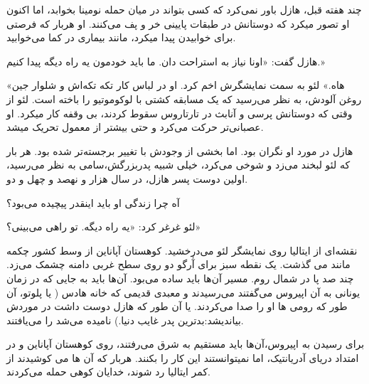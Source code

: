 \documentclass{book}
\begin{document}
چند هفته قبل، هازل باور نمی‌کرد که کسی بتواند در میان حمله نومینا بخوابد، اما اکنون او تصور میکرد که دوستانش در طبقات پایینی خر و پف می‌کنند. او هربار که فرصتی برای خوابیدن پیدا میکرد، مانند بیماری در کما می‌خوابید.

هازل گفت: «اونا نیاز به استراحت دان. ما باید خودمون یه راه دیگه پیدا کنیم.»

«هاه.»  لئو به سمت نمایشگرش اخم کرد. او در لباس کار تکه تکه‌اش و شلوار جین روغن آلودش، به نظر می‌رسید که یک مسابقه کشتی با لوکوموتیو را باخته است. لئو از وقتی که دوستانش پرسی و آنابث در تارتاروس سقوط کردند، بی وقفه کار میکرد. او عصبانی‌تر حرکت می‌کرد و حتی بیشتر از معمول تحریک میشد.

هازل در مورد او نگران بود. اما بخشی از وجودش با تغییر برجسته‌تر شده بود. هر بار که لئو لبخند می‌زد و شوخی می‌کرد، خیلی شبیه پدربزرگش،‌سامی به نظر می‌رسید، اولین دوست پسر هازل، در سال هزار و نهصد و چهل و دو.

آه چرا زندگی او باید اینقدر پیچیده می‌بود؟

لئو غرغر کرد: «یه راه دیگه. تو راهی می‌بینی؟»

نقشه‌ای از ایتالیا روی نمایشگر لئو می‌درخشید. کوهستان آپاناین از وسط کشور چکمه مانند می گذشت. یک نقطه سبز برای آٰرگو دو روی سطح غربی دامنه چشمک می‌زد. چند صد پا در شمال روم. مسیر آن‌ها باید ساده می‌بود. آن‌ها باید به جایی که در زمان یونانی به آن اپیروس می‌گفتند می‌رسیدند و معبدی قدیمی که خانه هادس ( یا پلوتو، آن طور که رومی ها او را صدا می‌کردند. یا آن طور که هازل دوست داشت در موردش بیاندیشد:‌بدترین پدر غایب دنیا.) نامیده می‌شد را می‌یافتند.

برای رسیدن به اپیروس،‌آن‌ها باید مستقیم به شرق می‌رفتند، روی کوهستان آپاناین و در امتداد دریای آدریانتیک، اما نمیتوانستند این کار را بکنند. هربار که آن ها می کوشیدند از کمر ایتالیا رد شوند، خدایان کوهی حمله می‌کردند.
\end{document}
